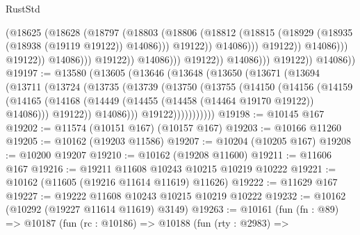 \begin{lexlean}{RustStd}
\begin{coremodule}
                                                  (@18625
                                                    (@18628
                                                      (@18797
                                                        (@18803
                                                          (@18806
                                                            (@18812
                                                              (@18815
                                                                (@18929
                                                                  (@18935
                                                                    (@18938 (@19119 @19122))
                                                                    @14086)))
                                                              @19122))
                                                          @14086)))
                                                    @19122))
                                                @14086)))
                                          @19122))
                                      @14086)))
                                @19122))
                            @14086)))
                      @19122))
                  @14086)))
            @19122))
        @14086))
@19197 := @13580
    (@13605
      (@13646
        (@13648
          (@13650
            (@13671
              (@13694
                (@13711
                  (@13724
                    (@13735
                      (@13739
                        (@13750
                          (@13755
                            (@14150
                              (@14156
                                (@14159
                                  (@14165
                                    (@14168
                                      (@14449 (@14455 (@14458 (@14464 @19170 @19122)) @14086)))
                                    @19122))
                                @14086)))
                          @19122)))))))))))
@19198 := @10145 @167
@19202 := @11574 (@10151 @167) (@10157 @167)
@19203 := @10166 @11260
@19205 := @10162 (@19203 @11586)
@19207 := @10204 (@10205 @167)
@19208 := @10200 @19207
@19210 := @10162 (@19208 @11600)
@19211 := @11606 @167
@19216 := @19211 @11608 @10243 @10215 @10219 @10222
@19221 := @10162 (@11605 (@19216 @11614 @11619) @11626)
@19222 := @11629 @167
@19227 := @19222 @11608 @10243 @10215 @10219 @10222
@19232 := @10162 (@10292 (@19227 @11614 @11619) @3149)
@19263 := @10161
    (fun (fn : @89) =>
    @10187
      (fun (rc : @10186) =>
      @10188
        (fun (rty : @2983) =>

\end{coremodule}
\end{lexlean}
